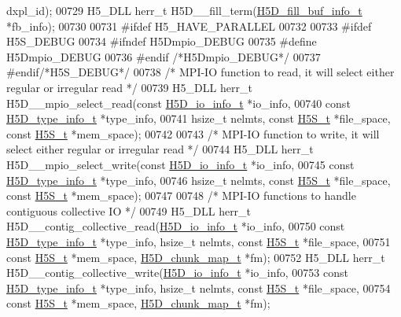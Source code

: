 \begin{DoxyCode}
      dxpl\_id);
00729 H5\_DLL herr\_t H5D\_\_fill\_term(\hyperlink{struct_h5_d__fill__buf__info__t}{H5D\_fill\_buf\_info\_t} *fb\_info);
00730 
00731 \textcolor{preprocessor}{#ifdef H5\_HAVE\_PARALLEL}
00732 
00733 \textcolor{preprocessor}{#ifdef H5S\_DEBUG}
00734 \textcolor{preprocessor}{#ifndef H5Dmpio\_DEBUG}
00735 \textcolor{preprocessor}{#define H5Dmpio\_DEBUG}
00736 \textcolor{preprocessor}{#endif }\textcolor{comment}{/*H5Dmpio\_DEBUG*/}\textcolor{preprocessor}{}
00737 \textcolor{preprocessor}{#endif}\textcolor{comment}{/*H5S\_DEBUG*/}\textcolor{preprocessor}{}
00738 \textcolor{comment}{/* MPI-IO function to read, it will select either regular or irregular read */}
00739 H5\_DLL herr\_t H5D\_\_mpio\_select\_read(\textcolor{keyword}{const} \hyperlink{struct_h5_d__io__info__t}{H5D\_io\_info\_t} *io\_info,
00740     \textcolor{keyword}{const} \hyperlink{struct_h5_d__type__info__t}{H5D\_type\_info\_t} *type\_info,
00741     hsize\_t nelmts, \textcolor{keyword}{const} \hyperlink{struct_h5_s__t}{H5S\_t} *file\_space, \textcolor{keyword}{const} \hyperlink{struct_h5_s__t}{H5S\_t} *mem\_space);
00742 
00743 \textcolor{comment}{/* MPI-IO function to write, it will select either regular or irregular read */}
00744 H5\_DLL herr\_t H5D\_\_mpio\_select\_write(\textcolor{keyword}{const} \hyperlink{struct_h5_d__io__info__t}{H5D\_io\_info\_t} *io\_info,
00745     \textcolor{keyword}{const} \hyperlink{struct_h5_d__type__info__t}{H5D\_type\_info\_t} *type\_info,
00746     hsize\_t nelmts, \textcolor{keyword}{const} \hyperlink{struct_h5_s__t}{H5S\_t} *file\_space, \textcolor{keyword}{const} \hyperlink{struct_h5_s__t}{H5S\_t} *mem\_space);
00747 
00748 \textcolor{comment}{/* MPI-IO functions to handle contiguous collective IO */}
00749 H5\_DLL herr\_t H5D\_\_contig\_collective\_read(\hyperlink{struct_h5_d__io__info__t}{H5D\_io\_info\_t} *io\_info,
00750     \textcolor{keyword}{const} \hyperlink{struct_h5_d__type__info__t}{H5D\_type\_info\_t} *type\_info, hsize\_t nelmts, \textcolor{keyword}{const} \hyperlink{struct_h5_s__t}{H5S\_t} *file\_space,
00751     \textcolor{keyword}{const} \hyperlink{struct_h5_s__t}{H5S\_t} *mem\_space, \hyperlink{struct_h5_d__chunk__map__t}{H5D\_chunk\_map\_t} *fm);
00752 H5\_DLL herr\_t H5D\_\_contig\_collective\_write(\hyperlink{struct_h5_d__io__info__t}{H5D\_io\_info\_t} *io\_info,
00753     \textcolor{keyword}{const} \hyperlink{struct_h5_d__type__info__t}{H5D\_type\_info\_t} *type\_info, hsize\_t nelmts, \textcolor{keyword}{const} \hyperlink{struct_h5_s__t}{H5S\_t} *file\_space,
00754     \textcolor{keyword}{const} \hyperlink{struct_h5_s__t}{H5S\_t} *mem\_space, \hyperlink{struct_h5_d__chunk__map__t}{H5D\_chunk\_map\_t} *fm);

\end{DoxyCode}
